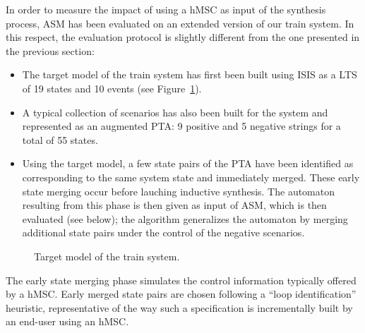 In order to measure the impact of using a hMSC as input of the synthesis process, ASM has been evaluated on an extended version of our train system. In this respect, the evaluation protocol is slightly different from the one presented in the previous section: 
\begin{itemize}
\item The target model of the train system has first been built using ISIS as a LTS of 19 states and 10 events (see Figure~\ref{image:case-studies-big-train-2}). 
\item A typical collection of scenarios has also been built for the system and represented as an augmented PTA: 9 positive and 5 negative strings for a total of 55 states.
\item Using the target model, a few state pairs of the PTA have been identified as corresponding to the same system state and immediately merged. These early state merging occur before lauching inductive synthesis. The automaton resulting from this phase is then given as input of ASM, which is then evaluated (see below); the algorithm generalizes the automaton by merging additional state pairs under the control of the negative scenarios.
\end{itemize}

\begin{figure}[H]
\centering
{}
\caption{Target model of the train system.\label{image:case-studies-big-train-2}}
\end{figure}

The early state merging phase simulates the control information typically offered by a hMSC. Early merged state pairs are chosen following a ``loop identification'' heuristic, representative of the way such a specification is incrementally built by an end-user using an hMSC. 

